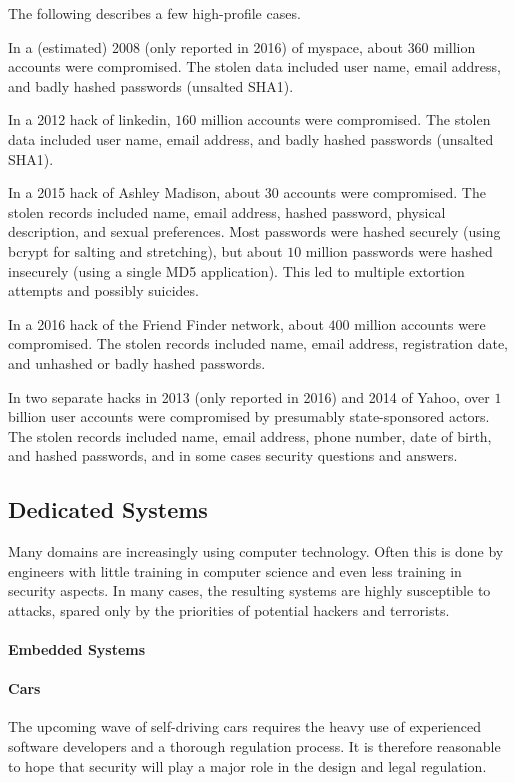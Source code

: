 The following describes a few high-profile cases.
\medskip

In a (estimated) 2008 (only reported in 2016) of myspace, about $360$ million accounts were compromised.
The stolen data included user name, email address, and badly hashed passwords (unsalted SHA1).

In a 2012 hack of linkedin, $160$ million accounts were compromised.
The stolen data included user name, email address, and badly hashed passwords (unsalted SHA1).

In a 2015 hack of Ashley Madison, about $30$ accounts were compromised.
The stolen records included name, email address, hashed password, physical description, and sexual preferences.
Most passwords were hashed securely (using bcrypt for salting and stretching), but about $10$ million passwords were hashed insecurely (using a single MD5 application).
This led to multiple extortion attempts and possibly suicides.

In a 2016 hack of the Friend Finder network, about $400$ million accounts were compromised.
The stolen records included name, email address, registration date, and unhashed or badly hashed passwords.

In two separate hacks in 2013 (only reported in 2016) and 2014 of Yahoo, over $1$ billion user accounts were compromised by presumably state-sponsored actors.
The stolen records included name, email address, phone number, date of birth, and hashed passwords, and in some cases security questions and answers.

\subsection{Dedicated Systems}

Many domains are increasingly using computer technology.
Often this is done by engineers with little training in computer science and even less training in security aspects.
In many cases, the resulting systems are highly susceptible to attacks, spared only by the priorities of potential hackers and terrorists.

\paragraph{Embedded Systems}

\paragraph{Cars}
The upcoming wave of self-driving cars requires the heavy use of experienced software developers and a thorough regulation process.
It is therefore reasonable to hope that security will play a major role in the design and legal regulation.

